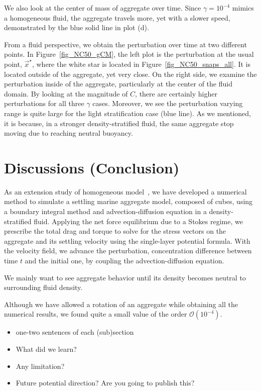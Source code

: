 We also look at the center of mass of aggregate over time. Since $\gamma = 10^{-4}$ mimics a homogeneous fluid, the aggregate travels more, yet with a slower speed, demonstrated by the blue solid line in plot (d).
\par
From a fluid perspective, we obtain the perturbation over time at two different points. In Figure~\ref{fig_NC50_gCM}, the left plot is the perturbation at the usual point, $\vec{x}^{\star}$, where the white star is located in Figure~\ref{fig_NC50_snaps_all}. It is located outside of the aggregate, yet very close. On the right side, we examine the perturbation inside of the aggregate, particularly at the center of the fluid domain. By looking at the magnitude of $C$, there are certainly higher perturbations for all three $\gamma$ cases. Moreover, we see the perturbation varying range is quite large for the light stratification case (blue line). As we mentioned, it is because, in a stronger density-stratified fluid, the same aggregate stop moving due to reaching neutral buoyancy.

\section{Discussions (Conclusion)}
As an extension study of homogeneous model~\cite{yoo_hydrodynamic_2020}, we have developed a numerical method to simulate a settling marine aggregate model, composed of cubes, using a boundary integral method and advection-diffusion equation in a density-stratified fluid.
Applying the net force equilibrium due to a Stokes regime, we prescribe the total drag and torque to solve for the stress vectors on the aggregate and its settling velocity using the single-layer potential formula.
With the velocity field, we advance the perturbation, concentration difference between time $t$ and the initial one, by coupling the advection-diffusion equation.

We mainly want to see aggregate behavior until its density becomes neutral to surrounding fluid density. 

Although we have allowed a rotation of an aggregate while obtaining all the numerical results, we found quite a small value of the order $\mathcal{O}(10^{-4})$. 
\begin{itemize}
	\item one-two sentences of each (sub)section
	\item What did we learn?
	\item Any limitation?
	\item Future potential direction? Are you going to publish this? 
\end{itemize}
